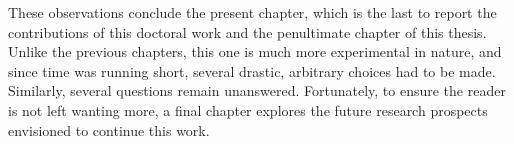 These observations conclude the present chapter, which is the last to report the contributions of this doctoral work and the penultimate chapter of this thesis. Unlike the previous chapters, this one is much more experimental in nature, and since time was running short, several drastic, arbitrary choices had to be made. Similarly, several questions remain unanswered. Fortunately, to ensure the reader is not left wanting more, a final chapter explores the future research prospects envisioned to continue this work.
